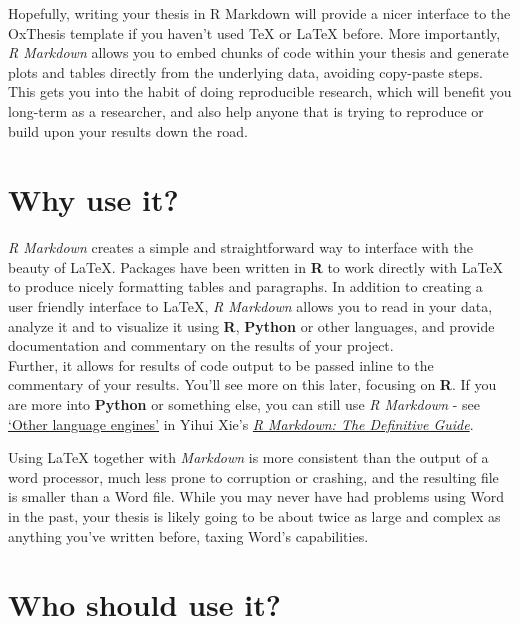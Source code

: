 \documentclass[a4paper, nobind]{templates/ociamthesis}
\begin{document}
Hopefully, writing your thesis in R Markdown will provide a nicer interface to the OxThesis template if you haven't used TeX or LaTeX before.
More importantly, \emph{R Markdown} allows you to embed chunks of code within your thesis and generate plots and tables directly from the underlying data, avoiding copy-paste steps.
This gets you into the habit of doing reproducible research, which will benefit you long-term as a researcher, and also help anyone that is trying to reproduce or build upon your results down the road.

\hypertarget{why-use-it}{%
\section{Why use it?}\label{why-use-it}}

\emph{R Markdown} creates a simple and straightforward way to interface with the beauty of LaTeX.
Packages have been written in \textbf{R} to work directly with LaTeX to produce nicely formatting tables and paragraphs.
In addition to creating a user friendly interface to LaTeX, \emph{R Markdown} allows you to read in your data, analyze it and to visualize it using \textbf{R}, \textbf{Python} or other languages, and provide documentation and commentary on the results of your project.\\

Further, it allows for results of code output to be passed inline to the commentary of your results.
You'll see more on this later, focusing on \textbf{R}.
If you are more into \textbf{Python} or something else, you can still use \emph{R Markdown} - see \href{https://bookdown.org/yihui/rmarkdown/language-engines.html}{`Other language engines'} in Yihui Xie's \href{https://bookdown.org/yihui/rmarkdown/language-engines.html}{\emph{R Markdown: The Definitive Guide}}.

Using LaTeX together with \emph{Markdown} is more consistent than the output of a word processor, much less prone to corruption or crashing, and the resulting file is smaller than a Word file.
While you may never have had problems using Word in the past, your thesis is likely going to be about twice as large and complex as anything you've written before, taxing Word's capabilities.

\hypertarget{who-should-use-it}{%
\section*{Who should use it?}\label{who-should-use-it}}
\end{document}
